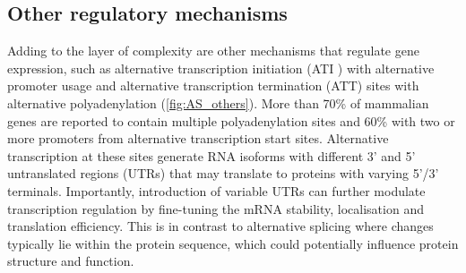 \newpage
\subsection{Other regulatory mechanisms}
Adding to the layer of complexity are other mechanisms that regulate gene expression, such as alternative transcription initiation (ATI ) with alternative promoter usage and alternative transcription termination (ATT) sites with alternative polyadenylation (\cref{fig:AS_others}). More than 70\% of mammalian genes are reported to contain multiple polyadenylation sites and 60\% with two or more promoters from alternative transcription start sites\cite{Carninci2006}. Alternative transcription at these sites generate RNA isoforms with different 3' and 5' untranslated regions (UTRs) that may translate to proteins with varying 5'/3' terminals. Importantly, introduction of variable UTRs can further modulate transcription regulation by fine-tuning the mRNA stability, localisation and translation efficiency\cite{Reyes2018}. This is in contrast to alternative splicing where changes typically lie within the protein sequence, which could potentially influence protein structure and function.

